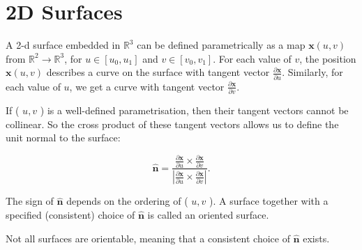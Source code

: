 
\section{2D Surfaces}

\begin{definition}[2D Surface]
  A 2-d surface embedded in $\mathbb{R}^3$ can be defined parametrically as a map $\boldsymbol{x}(u, v)$ from $\mathbb{R}^2 \rightarrow \mathbb{R}^3$, for $u \in\left[u_0, u_1\right]$ and $v \in\left[v_0, v_1\right]$. For each value of $v$, the position $\boldsymbol{x}(u, v)$ describes a curve on the surface with tangent vector $\frac{\partial \boldsymbol{x}}{\partial u}$. Similarly, for each value of \(u\), we get a curve with tangent vector \(\frac{\partial \boldsymbol{x}}{\partial v}\).
\end{definition}

\begin{definition}
  If ( \(u, v\) ) is a well-defined parametrisation, then their tangent vectors cannot be collinear. So the cross product of these tangent vectors allows us to define the unit normal to the surface:

\[
\hat{\boldsymbol{n}}=\frac{\frac{\partial \boldsymbol{x}}{\partial u} \times \frac{\partial \boldsymbol{x}}{\partial v}}{\left|\frac{\partial \boldsymbol{x}}{\partial u} \times \frac{\partial \boldsymbol{x}}{\partial v}\right|} .
\]

The sign of \(\hat{\boldsymbol{n}}\) depends on the ordering of ( \(u, v\) ). A surface together with a specified (consistent) choice of \(\hat{\boldsymbol{n}}\) is called an oriented surface.
\end{definition}

\begin{remark}
  Not all surfaces are orientable, meaning that a consistent choice of $\mathbf{\hat{n}}$ exists.
\end{remark}

